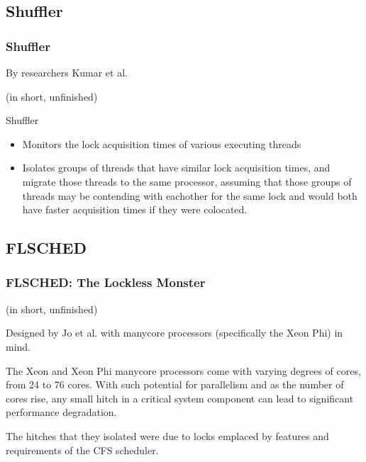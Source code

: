 \documentclass{beamer}
\newcommand{\linespace}{\vskip 0.25cm}
\begin{document}
\subsection{Shuffler}
\begin{frame}
\frametitle{Shuffler}

By researchers Kumar et al.

\linespace


\end{frame}
\begin{frame}

(in short, unfinished)

Shuffler
\begin{itemize}

\item Monitors the lock acquisition times of various executing threads
\item Isolates groups of threads that have similar lock acquisition times, and migrate those threads to the same processor, assuming that those groups of threads may be contending with eachother for the same lock and would both have faster acquisition times if they were colocated.
\end{itemize}

\end{frame}

\subsection{FLSCHED}
\begin{frame}
\frametitle{FLSCHED: The Lockless Monster}

(in short, unfinished)

Designed by Jo et al. with manycore processors (specifically the Xeon Phi) in mind.

\linespace

The Xeon and Xeon Phi manycore processors come with varying degrees of cores, from 24 to 76 cores. With such potential for parallelism and as the number of cores rise, any small hitch in a critical system component can lead to significant performance degradation. 

The hitches that they isolated were due to locks emplaced by features and requirements of the CFS scheduler.

\end{frame}
\end{document}
